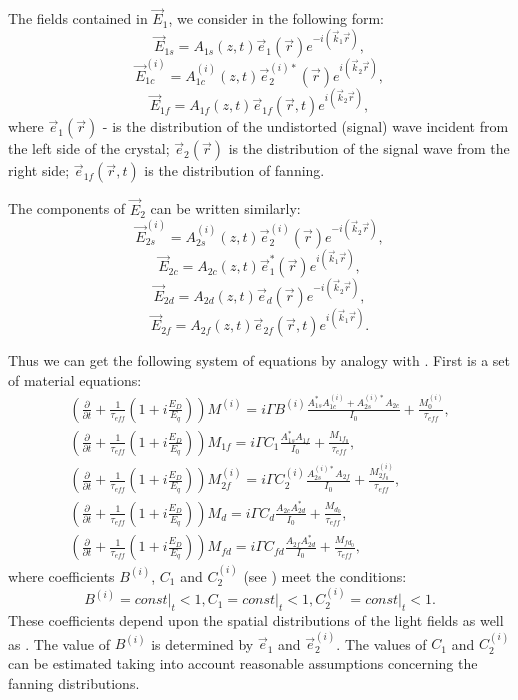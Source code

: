 The fields contained in $\vec {E}_1$, we consider in the following form:
\[
\vec{E}_{1s}=A_{1s}(z,t)\vec{e}_1(\vec{r})e^{-i(\vec{k}_1\vec{r})},
\]
\[
\vec{E}_{1c}^{(i)}=A^{(i)}_{1c}(z,t)\vec{e}_2^{(i)\ast}
(\vec{r})e^{i(\vec{k}_2\vec{r})}, 
\]
\[
\vec{E}_{1f}=A_{1f}(z,t)\vec{e}_{1f}(\vec{r},t)e^{i(\vec{k}_2\vec{r})}, 
\]
\noindent where $\vec{e}_1(\vec{r})$ - is the distribution of the
undistorted (signal) wave incident from the left side of the
crystal; $\vec{e}_2(\vec{r})$ is the distribution of the signal
wave from the right side; $\vec{e}_{1f}(\vec{r},t)$ is the
distribution of fanning.

The components of $\vec{E}_2$ can be written similarly:
\[
\vec{E}_{2s}^{(i)}=A^{(i)}_{2s}(z,t)\vec{e}_2^{(i)}(\vec{r})
e^{-i(\vec{k}_2\vec{r})},
\]
\[
\vec{E}_{2c}=A_{2c}(z,t)\vec{e}_1^\ast(\vec{r})e^{i(\vec{k}_1\vec{r})}, 
\]
\[
\vec{E}_{2d}=A_{2d}(z,t)\vec{e}_d(\vec{r})e^{-i(\vec{k}_2\vec{r})}, 
\]
\[
\vec{E}_{2f}=A_{2f}(z,t)\vec{e}_{2f}(\vec{r},t)e^{i(\vec{k}_1\vec{r})}.
\]

Thus we can get the following system of equations by analogy with
\cite{ourSemi}.
First is a set of material equations:
\begin{eqnarray}  
\left(\frac{\partial}{\partial{t}} 
+\frac{1}{\tau_{eff}}
\left(
1 + i \frac{E_D}{E_q}
\right)
\right) M^{(i)}
= 
i \Gamma B^{(i)} 
\frac{A_{1s}^{\ast}A_{1c}^{(i)}+A_{2s}^{(i)\ast}A_{2c}}{I_0}
+ \frac{M_0^{(i)}}{\tau_{eff}},
\nonumber \\
\left(\frac{\partial}{\partial{t}} 
+\frac{1}{\tau_{eff}}
\left(
1 + i \frac{E_D}{E_q}
\right) 
\right) 
{M_{1f}} = 
i\Gamma C_1 \frac{A_{1s}^{\ast}A_{1f}}{I_0}
+ \frac{M_{1f_0}}{\tau_{eff}},
\nonumber \\
\left(\frac{\partial}{\partial{t}} 
+\frac{1}{\tau_{eff}}
\left(
1 + i \frac{E_D}{E_q}
\right) 
\right) 
{M_{2f}^{(i)}} = 
i\Gamma C_2^{(i)} \frac{A_{2s}^{(i)\ast}A_{2f}}{I_0}
+ \frac{M_{2f_0}^{(i)}}{\tau_{eff}},
\nonumber \\
\left(\frac{\partial}{\partial{t}} 
+\frac{1}{\tau_{eff}}
\left(
1 + i \frac{E_D}{E_q}
\right) 
\right) 
{M_d} = 
i \Gamma C_d \frac{A_{2c} A_{2d}^{\ast}}{I_0}
+ \frac{M_{d_0}}{\tau_{eff}},
\nonumber \\
\left(\frac{\partial}{\partial{t}} 
+\frac{1}{\tau_{eff}}
\left(
1 + i \frac{E_D}{E_q}
\right) 
\right) 
{M_{fd}} = 
i \Gamma C_{fd} \frac{A_{2f} A_{2d}^{\ast}}{I_0} +
\frac{M_{fd_0}}{\tau_{eff}},
\label{eqGrating_gen} 
\end{eqnarray} 
\noindent where coefficients $B^{(i)}$, $C_1$ and $C_2^{(i)}$ (see
\cite{ourSemi}) meet the conditions: 
\[
B^{(i)} = \left.const\right|_t < 1,
C_1 = \left.const\right|_t < 1,
C_2^{(i)} = \left.const\right|_t < 1.
\]
These  coefficients
depend upon the spatial distributions of the light fields as well as \cite{ourSemi}. The
value of $B^{(i)}$ is determined by $\vec{e}_1$ and $\vec{e}_2^{(i)}$. The
values of $C_1$ and $C_2^{(i)}$ can be estimated taking into account
reasonable assumptions concerning the fanning distributions.

